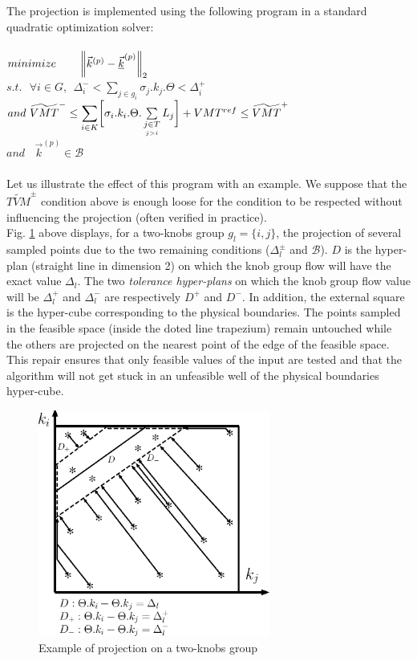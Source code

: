 The projection is implemented using the following program in a standard quadratic optimization solver:\\
\\
$minimize \ \ \ \ \ \ \norm{\vec{k}^{(p)}-\underline{\vec{k}}^{(p)}}_{2}$\\
$s.t.\ \ \ \forall i\in{G}, \ \ \Delta_{i}^{-}< \sum_{j\in{g_{i}}} \sigma_{j}.k_{j}.\Theta<\Delta_{i}^{+}$\\
$and\ \widetilde{VMT}^{-}\leq\mathlarger{\sum\limits_{i\in K}}\biggl[\sigma_{i}.k_{i}.\Theta.	\sum\limits_{\underset{j>i}{j\in T}}L_{j}\biggr]+VMT^{ref}\leq \widetilde{VMT}^{+}\nonumber $\\
$and\ \ \ \ \vec{k}^{(p)}\in \mathscr{B}$\\
\\
Let us illustrate the effect of this program with an example. We suppose that the $\widetilde{TVM}^{\pm}$ condition above is enough loose for the condition to be respected without influencing the projection (often verified in practice).\\
Fig. \ref{fig:proj} above displays, for a two-knobs group $g_{l}=\{i,j\}$, the projection of several sampled points due to the two remaining conditions ($\Delta_{l}^{\pm}$ and $\mathscr{B}$). $D$ is the hyper-plan (straight line in dimension 2) on which the knob group flow will have the exact value $\Delta_{l}$.
The two \emph{tolerance hyper-plans} on which the knob group flow value will be $\Delta_{l}^{+}$ and $\Delta_{l}^{-}$ are respectively $D^{+}$ and $D^{-}$.
In addition, the external square is the hyper-cube corresponding to the physical boundaries. 
The points sampled in the feasible space (inside the doted line trapezium) remain untouched while the others are projected on the nearest point of the edge of the feasible space.\\
This repair ensures that only feasible values of the input are tested and that the algorithm will not get stuck in an unfeasible well of the physical boundaries hyper-cube.\\
\begin{figure}
\centering
\includegraphics[width=3in]{figures/proj.eps}
\caption{Example of projection on a two-knobs group}
\label{fig:proj}
\end{figure}
